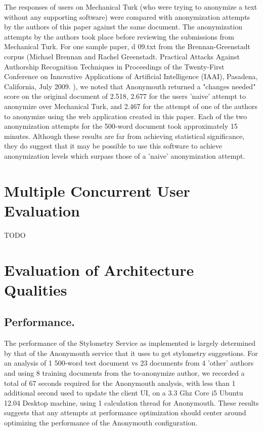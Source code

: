 \documentclass[letterpaper]{article}
\begin{document}
The responses of users on Mechanical Turk (who were trying to
anonymize a text without any supporting software) were compared with
anonymization attempts by the authors of this paper against the same
document. The anonymization attempts by the authors took place before
reviewing the submissions from Mechanical Turk. For one sample paper,
d 09.txt from the Brennan-Greenstadt corpus (Michael Brennan and Rachel Greenstadt. Practical Attacks Against Authorship Recognition Techniques in Proceedings of the Twenty-First Conference on Innovative Applications of Artificial Intelligence (IAAI), Pasadena, California, July 2009.
), we noted that Anonymouth returned a "changes needed" score
on the original document of 2.518, 2.677 for the users 'naive' attempt
to anonymize over Mechanical Turk, and 2.467 for the attempt of one of
the authors to anonymize using the web application created in this
paper. Each of the two anonymization attempts for the 500-word
document took approximately 15 minutes. Although these results are far from achieving statistical
significance, they do suggest that it may be possible to use this
software to achieve anonymization levels which surpass those of a
'naive' anonymization attempt.

\section{Multiple Concurrent User Evaluation}

TODO

\section{Evaluation of Architecture Qualities}

\subsection{Performance.}

The performance of the Stylometry Service as implemented is largely
determined by that of the Anonymouth service that it uses to get
stylometry suggestions. For an analysis of 1 500-word test document vs
23 documents from 4 'other' authors and using 8 training documents
from the to-anonymize author, we recorded a total of 67 seconds
required for the Anonymouth analysis, with less than 1 additional
second used to update the client UI, on a 3.3 Ghz Core i5 Ubuntu 12.04
Desktop machine, using 1 calculation thread for Anonymouth. These results suggests that any attempts at
performance optimization should center around optimizing the
performance of the Anonymouth configuration.
\end{document}
